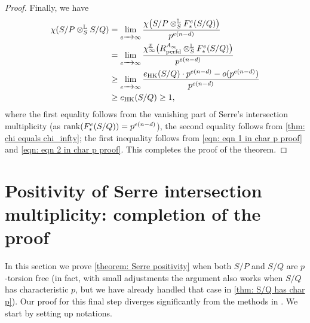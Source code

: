 \documentclass[12pt]{amsart}
\numberwithin{equation}{theorem}
\numberwithin{equation}{theorem}
\newcommand{\perfd}{\textnormal{perfd}}
\begin{document}
\begin{proof}
Finally, we have 
\begin{align*}
\chi(S/P \otimes^\myL_SS/Q) & = \lim_{e\to\infty} \frac{\chi\big(S/P \otimes^\myL_SF^e_*(S/Q)\big)}{p^{e(n-d)}} \\
& = \lim_{e\to\infty} \frac{\chi_\infty^{\underline{x}}\big(R^{A_\infty}_\perfd \otimes^\myL_SF^e_*(S/Q)\big)}{p^{e(n-d)}} \\
& \geq \lim_{e\to\infty} \frac{e_\text{HK}(S/Q)\cdot p^{e(n-d)} - o(p^{e(n-d)}) }{p^{e(n-d)}} \\
& \geq e_\text{HK}(S/Q)\geq 1,
\end{align*}
where the first equality follows from the vanishing part of Serre's intersection multiplicity (as $\operatorname{{rank}}(F^e_*(S/Q))=p^{e(n-d)}$), the second equality follows from \autoref{thm: chi equals chi_infty}; the first inequality follows from \autoref{eqn: eqn 1 in char p proof} and \autoref{eqn: eqn 2 in char p proof}. This completes the proof of the theorem.
\end{proof}


\section{Positivity of Serre intersection multiplicity: completion of the proof}
\label{sec: second step}

In this section we prove \autoref{theorem: Serre positivity} when both $S/P$ and $S/Q$ are $p$-torsion free (in fact, with small adjustments the argument also works when $S/Q$ has characteristic $p$, but we have already handled that case in \autoref{thm: S/Q has char p}). Our proof for this final step diverges significantly from the methods in \cite[Section 4 and Section 5]{OpenAISerrePositivity2026}. We start by setting up notations. 
\end{document}
